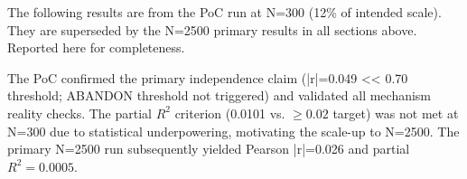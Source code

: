 
The following results are from the PoC run at N=300 (12\% of intended scale). They are superseded by the N=2500 primary results in all sections above. Reported here for completeness.

\begin{table}[htbp]
\centering
{}
\end{table}

The PoC confirmed the primary independence claim (|r|=0.049 << 0.70 threshold; ABANDON threshold not triggered) and validated all mechanism reality checks. The partial $R^2$ criterion (0.0101 vs. $\geq 0.02$ target) was not met at N=300 due to statistical underpowering, motivating the scale-up to N=2500. The primary N=2500 run subsequently yielded Pearson |r|=0.026 and partial $R^{2}=0.0005$.
